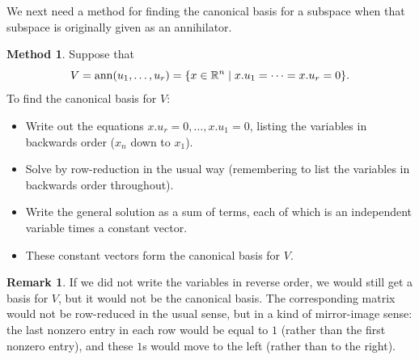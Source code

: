 \documentclass[reqno]{amsart}
\theoremstyle{definition}
\newtheorem{remark}[theorem]{Remark}
\newtheorem{method}[theorem]{Method}
\begin{document}
We next need a method for finding the canonical basis for a subspace
when that subspace is originally given as an annihilator.

\begin{method}\label{meth-ann-basis}
 Suppose that
 \[ V=\operatorname{ann}(u_1,\dotsc,u_r)=\{x\in{\mathbb{R}}^n\;|\; x.u_1=\dotsb=x.u_r=0\}. \]
 To find the canonical basis for $V$:
 \begin{itemize}
  \item[(a)] Write out the equations $x.u_r=0,\dotsc,x.u_1=0$, listing
   the variables in backwards order ($x_n$ down to $x_1$).
  \item[(b)] Solve by row-reduction in the usual way (remembering to
   list the variables in backwards order throughout).
  \item[(c)] Write the general solution as a sum of terms, each of
   which is an independent variable times a constant vector.
  \item[(d)] These constant vectors form the canonical basis for $V$.
 \end{itemize}
\end{method}

\begin{remark}\label{rem-mirror}
 If we did not write the variables in reverse order, we would still
 get a basis for $V$, but it would not be the canonical basis.  The
 corresponding matrix would not be row-reduced in the usual sense, but
 in a kind of mirror-image sense: the last nonzero entry in each row
 would be equal to $1$ (rather than the first nonzero entry), and
 these $1$s would move to the left (rather than to the right).
\end{remark}
\end{document}
